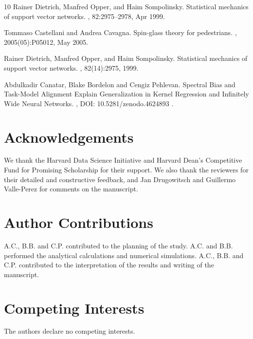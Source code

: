 \documentclass[11pt]{article}
\begin{document}
\begin{thebibliography}{10}
Rainer Dietrich, Manfred Opper, and Haim Sompolinsky.
\newblock Statistical mechanics of support vector networks.
, 82:2975--2978, Apr 1999.

Tommaso Castellani and Andrea Cavagna.
\newblock Spin-glass theory for pedestrians.
,
  2005(05):P05012, May 2005.

Rainer Dietrich, Manfred Opper, and Haim Sompolinsky.
\newblock Statistical mechanics of support vector networks.
, 82(14):2975, 1999.

Abdulkadir Canatar, Blake Bordelon and Cengiz Pehlevan.
\newblock Spectral Bias and Task-Model Alignment Explain Generalization in Kernel Regression and Infinitely Wide Neural Networks.
, {DOI: 10.5281/zenodo.4624893}
.

\end{thebibliography}





\section*{Acknowledgements}

We thank the Harvard Data Science Initiative and Harvard Dean’s Competitive Fund for Promising Scholarship for their support. We also thank the reviewers for their detailed and constructive feedback, and Jan Drugowitsch and Guillermo Valle-Perez for comments on the manuscript.


\section*{Author Contributions}

A.C., B.B. and C.P. contributed to the planning of the study. A.C. and B.B. performed the analytical calculations and numerical simulations. A.C., B.B. and C.P. contributed to the interpretation of the results and writing of the manuscript.

\section*{Competing Interests}

The authors declare no competing interests.


\end{document}
